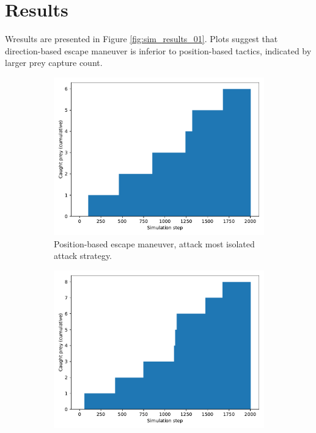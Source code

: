 \documentclass[9pt]{pnas-new}
\begin{document}
\section*{Results}

Wresults are presented in Figure \ref{fig:sim_results_01}. Plots suggest that
direction-based escape maneuver is inferior to position-based tactics, indicated by larger prey
capture count.
\begin{figure}[h]
    \centering
    \begin{subfigure}[t]{0.4\linewidth}
        \includegraphics[width=\linewidth]{avoid_position_attack_peripheral/predator_success_cumulative_2003.pdf}
        \caption{Position-based escape maneuver, attack most isolated attack strategy.}
    \end{subfigure}%
    \hspace{0.02\linewidth} %
    \begin{subfigure}[t]{0.4\linewidth}
        \includegraphics[width=\linewidth]{avoid_position_attack_nearest/predator_success_cumulative_2003.pdf}

\end{subfigure}
\end{figure}
\end{document}
